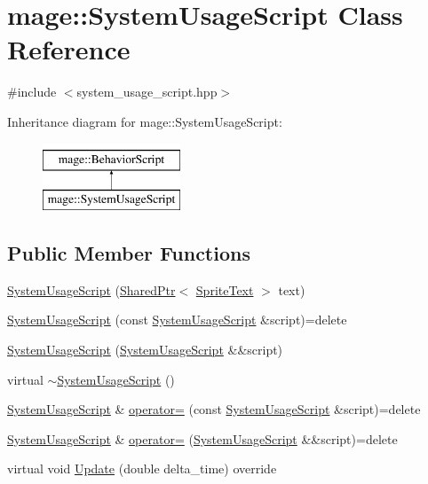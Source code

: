 \hypertarget{classmage_1_1_system_usage_script}{}\section{mage\+:\+:System\+Usage\+Script Class Reference}
\label{classmage_1_1_system_usage_script}


{\ttfamily \#include $<$system\+\_\+usage\+\_\+script.\+hpp$>$}

Inheritance diagram for mage\+:\+:System\+Usage\+Script\+:\begin{figure}[H]
\begin{center}
\leavevmode
\includegraphics[height=2.000000cm]{classmage_1_1_system_usage_script}
\end{center}
\end{figure}
\subsection*{Public Member Functions}
\begin{DoxyCompactItemize}
\item 
\hyperlink{classmage_1_1_system_usage_script_a430d87647bdc6e407838863b1fcb750d}{System\+Usage\+Script} (\hyperlink{namespacemage_a1e01ae66713838a7a67d30e44c67703e}{Shared\+Ptr}$<$ \hyperlink{classmage_1_1_sprite_text}{Sprite\+Text} $>$ text)
\item 
\hyperlink{classmage_1_1_system_usage_script_a3fccc6dda27ede785fb9c45360e53bb0}{System\+Usage\+Script} (const \hyperlink{classmage_1_1_system_usage_script}{System\+Usage\+Script} \&script)=delete
\item 
\hyperlink{classmage_1_1_system_usage_script_a013e7c6510442421d74bffa3b2f810fe}{System\+Usage\+Script} (\hyperlink{classmage_1_1_system_usage_script}{System\+Usage\+Script} \&\&script)
\item 
virtual \hyperlink{classmage_1_1_system_usage_script_ac4c71b831e5cd5d6a5db8783150b76cc}{$\sim$\+System\+Usage\+Script} ()
\item 
\hyperlink{classmage_1_1_system_usage_script}{System\+Usage\+Script} \& \hyperlink{classmage_1_1_system_usage_script_a3ca814599a30991f3e6068cec2b876df}{operator=} (const \hyperlink{classmage_1_1_system_usage_script}{System\+Usage\+Script} \&script)=delete
\item 
\hyperlink{classmage_1_1_system_usage_script}{System\+Usage\+Script} \& \hyperlink{classmage_1_1_system_usage_script_ad9c1a2f19c6d79adbd32789e479e1427}{operator=} (\hyperlink{classmage_1_1_system_usage_script}{System\+Usage\+Script} \&\&script)=delete
\item 
virtual void \hyperlink{classmage_1_1_system_usage_script_af7189c6e81dabfe077710ed9f3c7cd09}{Update} (double delta\+\_\+time) override
\end{DoxyCompactItemize}
